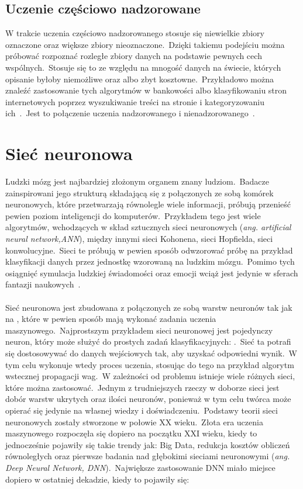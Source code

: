 \subsection{Uczenie częściowo nadzorowane}
W trakcie uczenia częściowo nadzorowanego stosuje się niewielkie zbiory oznaczone oraz większe zbiory nieoznaczone.\ Dzięki takiemu podejściu można próbować rozpoznać rozległe zbiory danych na podstawie pewnych cech wspólnych.\ Stosuje się to ze względu na mnogość danych na świecie, których opisanie byłoby niemożliwe oraz albo zbyt kosztowne.\ Przykładowo można znaleźć zastosowanie tych algorytmów w bankowości albo klasyfikowaniu stron internetowych poprzez wyszukiwanie treści na stronie i kategoryzowaniu ich~\cite{semiLinkedin}.\ Jest to połączenie uczenia nadzorowanego i nienadzorowanego~\cite{Mahesh2018}.


\section{Sieć neuronowa}
\label{sec:snn}
Ludzki mózg jest najbardziej złożonym organem znany ludziom.\ Badacze zainspirowani jego strukturą składającą się z połączonych ze sobą komórek neuronowych, które przetwarzają równolegle wiele informacji, próbują przenieść pewien poziom inteligencji do komputerów.\ Przykładem tego jest wiele algorytmów, wchodzących w skład sztucznych sieci neuronowych (\textit{ang. artificial neural network,ANN}), między innymi sieci Kohonena, sieci Hopfielda, sieci konwolucyjne.\ Sieci te próbują w pewien sposób odwzorować próbę na przykład klasyfikacji danych przez jednostkę wzorowaną na ludzkim mózgu.\ Pomimo tych osiągnięć symulacja ludzkiej świadomości oraz emocji wciąż jest jedynie w sferach fantazji naukowych~\cite{Wang2003}.
\\ \\
Sieć neuronowa jest zbudowana z połączonych ze sobą warstw neuronów tak jak na , które w pewien sposób mają wykonać zadania uczenia maszynowego.\ Najprostszym przykładem sieci neuronowej jest pojedynczy neuron, który może służyć do prostych zadań klasyfikacyjnych: .\ Sieć ta potrafi się dostosowywać do danych wejściowych tak, aby uzyskać odpowiedni wynik.\ W tym celu wykonuje wtedy proces uczenia, stosując do tego na przykład algorytm wstecznej propagacji wag.\ W zależności od problemu istnieje wiele różnych sieci, które można zastosować.\ Jednym z trudniejszych rzeczy w doborze sieci jest dobór warstw ukrytych oraz ilości neuronów, ponieważ w tym celu twórca może opierać się jedynie na własnej wiedzy i doświadczeniu.\ Podstawy teorii sieci neuronowych zostały stworzone w połowie XX wieku.\ Złota era uczenia maszynowego rozpoczęła się dopiero na początku XXI wieku, kiedy to jednocześnie pojawiły się takie trendy jak: Big Data, redukcja kosztów obliczeń równoległych oraz pierwsze badania nad głębokimi sieciami neuronowymi (\textit{ang. Deep Neural Network, DNN}).\ Największe zastosowanie DNN miało miejsce dopiero w ostatniej dekadzie, kiedy to pojawiły się:

